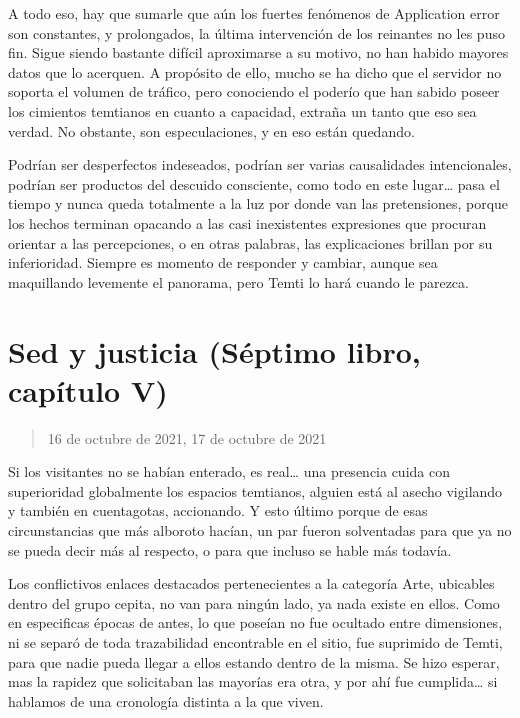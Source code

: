 \documentclass[
]{book}
\begin{document}
A todo eso, hay que sumarle que aún los fuertes fenómenos de Application error son constantes, y prolongados, la última intervención de los reinantes no les puso fin. Sigue siendo bastante difícil aproximarse a su motivo, no han habido mayores datos que lo acerquen. A propósito de ello, mucho se ha dicho que el servidor no soporta el volumen de tráfico, pero conociendo el poderío que han sabido poseer los cimientos temtianos en cuanto a capacidad, extraña un tanto que eso sea verdad. No obstante, son especulaciones, y en eso están quedando.

Podrían ser desperfectos indeseados, podrían ser varias causalidades intencionales, podrían ser productos del descuido consciente, como todo en este lugar\ldots{} pasa el tiempo y nunca queda totalmente a la luz por donde van las pretensiones, porque los hechos terminan opacando a las casi inexistentes expresiones que procuran orientar a las percepciones, o en otras palabras, las explicaciones brillan por su inferioridad. Siempre es momento de responder y cambiar, aunque sea maquillando levemente el panorama, pero Temti lo hará cuando le parezca.

\hypertarget{sed-y-justicia-suxe9ptimo-libro-capuxedtulo-v}{%
\section{Sed y justicia (Séptimo libro, capítulo V)}\label{sed-y-justicia-suxe9ptimo-libro-capuxedtulo-v}}

\begin{quote}
16 de octubre de 2021, 17 de octubre de 2021
\end{quote}

Si los visitantes no se habían enterado, es real\ldots{} una presencia cuida con superioridad globalmente los espacios temtianos, alguien está al asecho vigilando y también en cuentagotas, accionando. Y esto último porque de esas circunstancias que más alboroto hacían, un par fueron solventadas para que ya no se pueda decir más al respecto, o para que incluso se hable más todavía.

Los conflictivos enlaces destacados pertenecientes a la categoría Arte, ubicables dentro del grupo cepita, no van para ningún lado, ya nada existe en ellos. Como en especificas épocas de antes, lo que poseían no fue ocultado entre dimensiones, ni se separó de toda trazabilidad encontrable en el sitio, fue suprimido de Temti, para que nadie pueda llegar a ellos estando dentro de la misma. Se hizo esperar, mas la rapidez que solicitaban las mayorías era otra, y por ahí fue cumplida\ldots{} si hablamos de una cronología distinta a la que viven.
\end{document}
